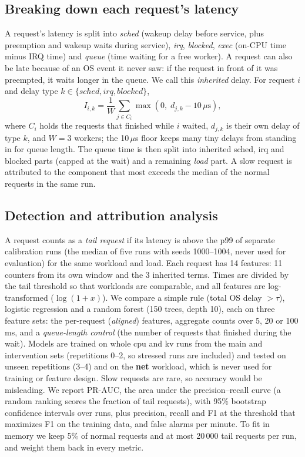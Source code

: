 \subsection{Breaking down each request's latency}
A request's latency is split into \emph{sched} (wakeup delay before
service, plus preemption and wakeup waits during service), \emph{irq},
\emph{blocked}, \emph{exec} (on-CPU time minus IRQ time) and \emph{queue}
(time waiting for a free worker). A request can also be late because of an
OS event it never saw: if the request in front of it was preempted, it
waits longer in the queue. We call this \emph{inherited} delay. For request
$i$ and delay type $k \in \{\mathit{sched}, \mathit{irq}, \mathit{blocked}\}$,
\begin{equation}
I_{i,k} = \frac{1}{W} \sum_{j \in C_i} \max\left(0,\; d_{j,k} - 10\,\mu\mathrm{s}\right),
\label{eq:inherited}
\end{equation}
where $C_i$ holds the requests that finished while $i$ waited, $d_{j,k}$ is
their own delay of type $k$, and $W{=}3$ workers; the 10\,$\mu$s floor keeps
many tiny delays from standing in for queue length. The queue time is
then split into inherited sched, irq and blocked parts (capped at the wait)
and a remaining \emph{load} part. A slow request is attributed to the
component that most exceeds the median of the normal requests in the same
run.

\subsection{Detection and attribution analysis}
A request counts as a \emph{tail request} if its latency is above the p99
of separate calibration runs (the median of five runs with seeds
1000--1004, never used for evaluation) for the same workload and load. Each
request has 14 features: 11 counters from its own window and the 3
inherited terms. Times are divided by the tail threshold so that workloads
are comparable, and all features are log-transformed ($\log(1{+}x)$). We
compare a simple rule (total OS delay $>\tau$), logistic regression and a
random forest (150 trees, depth 10), each on three feature sets: the
per-request (\emph{aligned}) features, aggregate counts over 5, 20 or
100\,ms, and a \emph{queue-length control} (the number of requests that
finished during the wait). Models are trained on whole cpu and kv runs
from the main and intervention sets (repetitions 0--2, so stressed runs are
included) and tested on unseen repetitions (3--4) and on the
\textbf{net} workload, which is never used for training or feature design.
Slow requests are rare, so accuracy would be misleading. We report PR-AUC,
the area under the precision--recall curve (a random ranking scores the
fraction of tail requests), with 95\% bootstrap confidence intervals over
runs, plus precision, recall and F1 at the threshold that maximizes F1 on
the training data, and false alarms per minute. To fit in memory we keep
5\% of normal requests and at most 20\,000 tail requests per run, and
weight them back in every metric.

